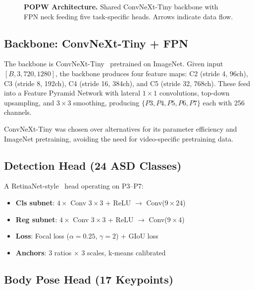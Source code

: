 \documentclass[10pt,twocolumn]{article}
\begin{document}
\begin{figure}[htbp]
\centering
{}
\caption{\textbf{POPW Architecture.} Shared ConvNeXt-Tiny backbone with FPN neck feeding five task-specific heads. Arrows indicate data flow.}
\label{fig:architecture}
\end{figure}

\subsection{Backbone: ConvNeXt-Tiny + FPN}

The backbone is ConvNeXt-Tiny~\cite{liu2022convnet} pretrained on ImageNet. Given input $[B, 3, 720, 1280]$, the backbone produces four feature maps: C2 (stride 4, 96ch), C3 (stride 8, 192ch), C4 (stride 16, 384ch), and C5 (stride 32, 768ch). These feed into a Feature Pyramid Network with lateral $1\times1$ convolutions, top-down upsampling, and $3\times3$ smoothing, producing $\{P3, P4, P5, P6, P7\}$ each with 256 channels.

ConvNeXt-Tiny was chosen over alternatives for its parameter efficiency and ImageNet pretraining, avoiding the need for video-specific pretraining data.

\subsection{Detection Head (24 ASD Classes)}

A RetinaNet-style~\cite{lin2017focal} head operating on P3--P7:
\begin{itemize}[nosep]
\item \textbf{Cls subnet}: $4\times$ Conv $3\times3$ + ReLU $\rightarrow$ Conv($9 \times 24$)
\item \textbf{Reg subnet}: $4\times$ Conv $3\times3$ + ReLU $\rightarrow$ Conv($9 \times 4$)
\item \textbf{Loss}: Focal loss ($\alpha=0.25$, $\gamma=2$) + GIoU loss
\item \textbf{Anchors}: 3 ratios $\times$ 3 scales, k-means calibrated
\end{itemize}

\subsection{Body Pose Head (17 Keypoints)}
\end{document}
